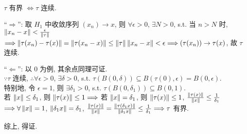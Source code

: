 \documentclass{note}
\begin{document}
\begin{thm}[(课本定理 13.31)]
    $\tau$ 有界 $\Longleftrightarrow\tau$ 连续.
\end{thm}
\begin{pf}
    ``$\Longrightarrow$'': 取 $H_1$ 中收敛序列 $(x_n)\rightarrow x$, 则 $\forall\epsilon>0$, $\exists N>0$, s.t. 当 $n>N$ 时, $\left\lVert x_n-x\right\rVert<\frac{\epsilon}{\left\lVert\tau\right\rVert}$\\
    $\Longrightarrow\left\lVert\tau(x_n)-\tau(x)\right\rVert=\left\lVert\tau(x_n-x)\right\rVert\leq\left\lVert\tau\right\rVert\left\lVert x_n-x\right\rVert<\epsilon\Longrightarrow(\tau(x_n))\rightarrow\tau(x)$, 故 $\tau$ 连续.

    ``$\Longleftarrow$'': 以 $0$ 为例, 其余点同理可证.\\
    $\because\tau$ 连续, $\therefore\forall\epsilon>0$, $\exists\delta>0$, s.t. $\tau(B(0,\delta))\subseteq B(\tau(0),\epsilon)=B(0,\epsilon)$.\\
    特别地, 令 $\epsilon=1$, 则 $\exists\delta_1>0$, s.t. $\tau(B(0,\delta_1))\subseteq B(0,1)$.\\
    若 $\left\lVert x\right\rVert\leq\delta_1$, 则 $\left\lVert\tau(x)\right\rVert\leq 1\Longrightarrow$ 若 $\left\lVert x\right\rVert=\delta_1$, 则 $\left\lVert\tau(x)\right\rVert\leq 1$, $\frac{\left\lVert\tau(x)\right\rVert}{\left\lVert x\right\rVert}\leq\frac{1}{\delta_1}$\\
    $\Longrightarrow\forall\left\lVert x\right\rVert=1$, $\left\lVert\delta_1x\right\rVert=\delta_1$, $\frac{\left\lVert\tau(x)\right\rVert}{\left\lVert x\right\rVert}=\frac{\left\lVert\tau(\delta_1x)\right\rVert}{\left\lVert\delta_1x\right\rVert}\leq\frac{1}{\delta_1}\Longrightarrow\tau$ 有界.

    综上, 得证.
\end{pf}
\end{document}
